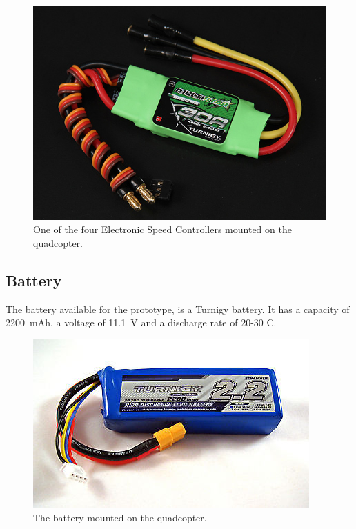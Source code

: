 %
\begin{figure}[H]
	\centering
	\includegraphics[scale=0.3]{figures/ESC}
	\caption{One of the four Electronic Speed Controllers mounted on the quadcopter.\cite{HKing}}
	\label{fig:esc}
\end{figure}
%
\subsection{Battery}
The battery available for the prototype, is a Turnigy battery. It has a capacity of \SI{2200}{mAh}, a voltage of \SI{11.1}{V} and a discharge rate of 20-30 C.\cite{HKingBattery}
%
\begin{figure}[H]
	\centering
	\includegraphics[scale=1.2]{figures/rd.jpg}
	\caption{The battery mounted on the quadcopter.\cite{HKingBattery}}
	\label{fig:battery}
\end{figure}

